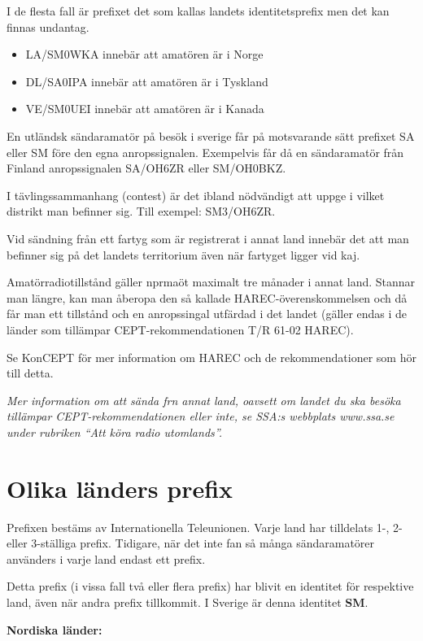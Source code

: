 I de flesta fall är prefixet det som kallas landets identitetsprefix
men det kan finnas undantag.

\begin{itemize}
\item LA/SM0WKA innebär att amatören är i Norge
\item DL/SA0IPA innebär att amatören är i Tyskland
\item VE/SM0UEI innebär att amatören är i Kanada
\end{itemize}

En utländsk sändaramatör på besök i sverige får på motsvarande sätt
prefixet SA eller SM före den egna anropssignalen. Exempelvis får då
en sändaramatör från Finland anropssignalen SA/OH6ZR eller SM/OH0BKZ.

I tävlingssammanhang (contest) är det ibland nödvändigt att uppge i
vilket distrikt man befinner sig. Till exempel: SM3/OH6ZR.

Vid sändning från ett fartyg som är registrerat i annat land innebär
det att man befinner sig på det landets territorium även när fartyget
ligger vid kaj.

Amatörradiotillstånd gäller nprmaöt maximalt tre månader i annat land.
Stannar man längre, kan man åberopa den så kallade
HAREC-överenskommelsen och då får man ett tillstånd och en
anropssingal utfärdad i det landet (gäller endas i de länder som
tillämpar CEPT-rekommendationen T/R 61-02 HAREC).

Se KonCEPT för mer information om HAREC och de rekommendationer som
hör till detta.

\emph{Mer information om att sända frn annat land, oavsett om landet
  du ska besöka tillämpar CEPT-re\-kom\-men\-da\-tio\-n\-en eller inte, se SSA:s
  webbplats www.ssa.se under rubriken ``Att köra radio utomlands''.}

\section{Olika länders prefix}

Prefixen bestäms av Internationella Teleunionen. Varje land har
tilldelats 1-, 2- eller 3-ställiga prefix. Tidigare, när det inte fan
så många sändaramatörer använders i varje land endast ett prefix.

Detta prefix (i vissa fall två eller flera prefix) har blivit en
identitet för respektive land, även när andra prefix tillkommit. I
Sverige är denna identitet \textbf{SM}.

\textbf{Nordiska länder:}

